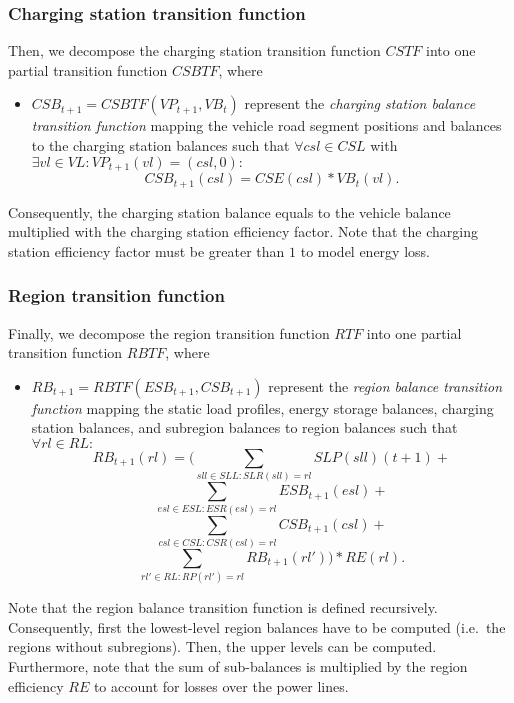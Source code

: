 \subsubsection{Charging station transition function}
\label{transitions_stations}

Then, we decompose the charging station transition function $CSTF$ into one partial transition function $CSBTF$, where
\begin{itemize}
	\item $CSB_{t+1} = CSBTF(VP_{t+1}, VB_t)$ represent the \textit{charging station balance transition function} mapping the vehicle road segment positions and balances to the charging station balances such that $\forall csl \in CSL$ with $\exists vl \in VL: VP_{t+1}(vl) = (csl, 0):$
	\[
		CSB_{t+1}(csl) = CSE(csl) * VB_{t}(vl) \textrm{.}
	\]
\end{itemize}
Consequently, the charging station balance equals to the vehicle balance multiplied with the charging station efficiency factor. Note that the charging station efficiency factor must be greater than $1$ to model energy loss.

\subsubsection{Region transition function}
\label{transitions_regions}

Finally, we decompose the region transition function $RTF$ into one partial transition function $RBTF$, where
\begin{itemize}
	\item $RB_{t+1} = RBTF(ESB_{t+1}, CSB_{t+1})$ represent the \textit{region balance transition function} mapping the static load profiles, energy storage balances, charging station balances, and subregion balances to region balances such that $\forall rl \in RL:$
	\[
		RB_{t+1}(rl) = (\sum_{sll \in SLL: SLR(sll) = rl} SLP(sll)(t+1) +
	\]
	\[
		\sum_{esl \in ESL: ESR(esl) = rl} ESB_{t+1}(esl) +
	\]
	\[
		\sum_{csl \in CSL: CSR(csl) = rl} CSB_{t+1}(csl) +
	\]
	\[
		\sum_{rl' \in RL: RP(rl') = rl} RB_{t+1}(rl')) * RE(rl) \textrm{.}
	\]
\end{itemize}
Note that the region balance transition function is defined recursively. Consequently, first the lowest-level region balances have to be computed (i.e.\ the regions without subregions). Then, the upper levels can be computed. Furthermore, note that the sum of sub-balances is multiplied by the region efficiency $RE$ to account for losses over the power lines.